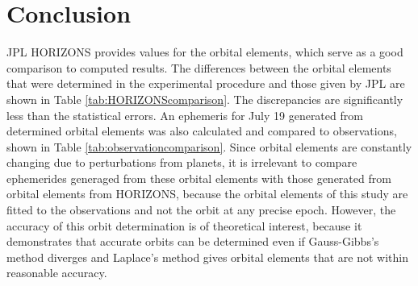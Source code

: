 \documentclass[12pt,journal,compsoc]{IEEEtran}
\begin{document}
\section{Conclusion}
JPL HORIZONS provides values for the orbital elements, which serve as a good comparison to computed results.
The differences between the orbital elements that were determined in the experimental procedure and those given by JPL 
are shown in Table \ref{tab:HORIZONScomparison}.
The discrepancies are significantly less than the statistical errors. 
An ephemeris for July 19 generated from determined orbital elements was also calculated and compared to observations, 
shown in Table \ref{tab:observationcomparison}.
Since orbital elements are constantly changing due to perturbations from planets,
it is irrelevant to compare ephemerides generaged from
these orbital elements with those generated from
orbital elements from HORIZONS, because the orbital elements of this study 
are fitted to the observations and not the orbit at any precise epoch.
However, the accuracy of this orbit determination is of theoretical interest, because 
it demonstrates that accurate orbits can be determined even if Gauss-Gibbs's method diverges
and Laplace's method gives orbital elements that are not within reasonable accuracy.

\end{document}

